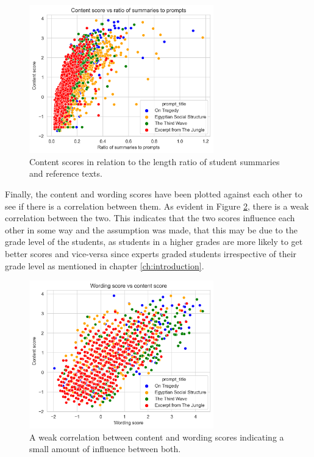 \begin{figure}[H]
\begin{center}
\includegraphics[width=80mm,scale=0.75]{img/content_ratio_summaries_to_prompts.png}
\end{center}
\caption{Content scores in relation to the length ratio of student summaries and reference texts.}
\label{fig:content-ratio}
\end{figure}
\pagebreak
\noindent Finally, the content and wording scores have been plotted against each other to see if there is a correlation between them. As evident in Figure \ref{fig:correlation-con-wor}, there is a weak correlation between the two. This indicates that the two scores influence each other in some way and the assumption was made, that this may be due to the grade level of the students, as students in a higher grades are more likely to get better scores and vice-versa since experts graded students irrespective of their grade level as mentioned in chapter \ref{ch:introduction}.\\

\begin{figure}[H]
\begin{center}
\includegraphics[width=80mm,scale=0.75]{img/wording_content_correlation.png}
\end{center}
\caption[Correlation between Wording and Content scores]{A weak correlation between content and wording scores indicating a small amount of influence between both.}
\label{fig:correlation-con-wor}
\end{figure}
